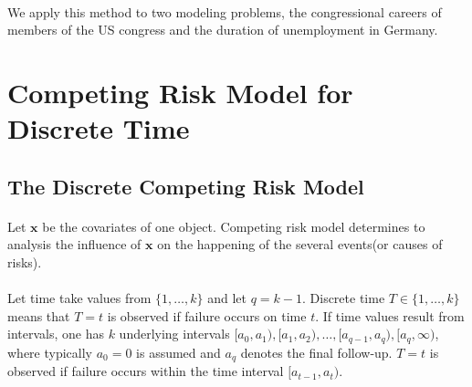 \documentclass[]{article}
\begin{document}
        \paragraph{}We apply this method to two modeling problems, the congressional careers of members of the US congress and the duration of unemployment in Germany.
    
    
    
    
    \section{Competing Risk Model for Discrete Time} %
    \subsection{The Discrete Competing Risk Model}
    \paragraph{} Let $\mathbf{x}$ be the covariates of one object. Competing risk model determines to analysis the influence of $\mathbf{x}$ on the happening of the several events(or causes of risks).
    \paragraph{}Let time take values from $\{1,\dots,k\}$ and let $q = k-1$. Discrete time $T \in \{1,\dots,k\}$ means that
    $T = t$ is observed if failure occurs on time $t$. If time values result from intervals, one has $k$ underlying intervals $[a_0, a_1),[a_1, a_2),\dots,[a_{q−1}, a_q), [a_q, \infty)$, where typically $a_0 = 0$ is assumed and $a_q$ denotes the final follow-up. $T = t$ is observed if failure occurs within the time interval $[a_{t−1}, a_t)$.
    
\end{document}
